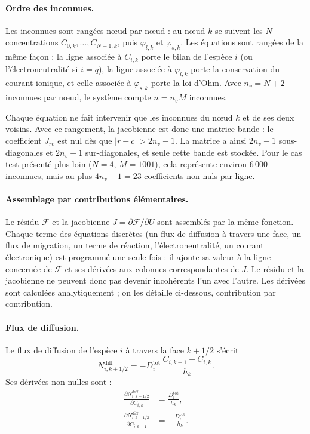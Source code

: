 \paragraph{Ordre des inconnues.} Les inconnues sont rangées nœud par nœud :
au nœud $k$ se suivent les $N$ concentrations $C_{0,k}, \dots, C_{N-1,k}$,
puis $\varphi_{l,k}$ et $\varphi_{s,k}$. Les équations sont rangées de la
même façon : la ligne associée à $C_{i,k}$ porte le bilan de l'espèce $i$
(ou l'électroneutralité si $i = q$), la ligne associée à $\varphi_{l,k}$
porte la conservation du courant ionique, et celle associée à
$\varphi_{s,k}$ porte la loi d'Ohm. Avec $n_v = N+2$ inconnues par nœud, le
système compte $n = n_v M$ inconnues.

Chaque équation ne fait intervenir que les inconnues du nœud $k$ et de ses
deux voisins. Avec ce rangement, la jacobienne est donc une matrice bande :
le coefficient $J_{rc}$ est nul dès que $|r - c| > 2n_v - 1$. La matrice a
ainsi $2n_v - 1$ sous-diagonales et $2n_v - 1$ sur-diagonales, et seule
cette bande est stockée. Pour le cas test présenté plus loin ($N = 4$,
$M = 1001$), cela représente environ $6\,000$ inconnues, mais au plus
$4n_v - 1 = 23$ coefficients non nuls par ligne.

\paragraph{Assemblage par contributions élémentaires.} Le résidu
$\mathcal{F}$ et la jacobienne $J = \partial\mathcal{F}/\partial U$ sont
assemblés par la même fonction. Chaque terme des équations discrètes (un flux
de diffusion à travers une face, un flux de migration, un terme de réaction,
l'électroneutralité, un courant électronique) est programmé une seule fois :
il ajoute sa valeur à la ligne concernée de $\mathcal{F}$ et ses dérivées
aux colonnes correspondantes de $J$. Le résidu et la jacobienne ne peuvent
donc pas devenir incohérents l'un avec l'autre. Les dérivées sont calculées
analytiquement ; on les détaille ci-dessous, contribution par contribution.

\paragraph{Flux de diffusion.} Le flux de diffusion de l'espèce $i$ à travers
la face $k+1/2$ s'écrit
\begin{equation*}
N^{\mathrm{diff}}_{i,k+1/2} = -D_i^{\mathrm{tot}}\,\frac{C_{i,k+1} - C_{i,k}}{h_k} .
\end{equation*}
Ses dérivées non nulles sont :
\begin{align*}
\frac{\partial N^{\mathrm{diff}}_{i,k+1/2}}{\partial C_{i,k}} &= \frac{D_i^{\mathrm{tot}}}{h_k} ,\\[0.2cm]
\frac{\partial N^{\mathrm{diff}}_{i,k+1/2}}{\partial C_{i,k+1}} &= -\frac{D_i^{\mathrm{tot}}}{h_k} .
\end{align*}

